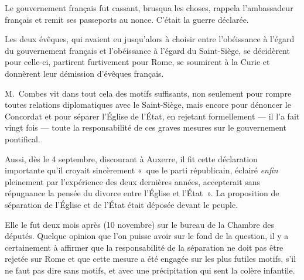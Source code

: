 \documentclass[french,twoside]{book} %
\begin{document}
Le gouvernement français fut cassant, brusqua les choses, rappela l’ambassadeur français et remit ses passeports au nonce. C’était la guerre déclarée.\par
Les deux évêques, qui avaient eu jusqu’alors à choisir entre l’obéissance à l’égard du gouvernement français et l’obéissance à l’égard du Saint-Siège, se décidèrent pour celle-ci, partirent furtivement pour Rome, se soumirent à la Curie et donnèrent leur démission d’évêques français.\par
M. Combes vit dans tout cela des motifs suffisants, non seulement pour rompre toutes relations diplomatiques avec le Saint-Siège, mais encore pour dénoncer le Concordat et pour séparer l’Église de l’État, en rejetant formellement — il l’a fait vingt fois — toute la responsabilité de ces graves mesures sur le gouvernement pontifical.\par
Aussi, dès le 4 septembre, discourant à Auxerre, il fit cette déclaration importante qu’il croyait  sincèrement « que le parti républicain, éclairé {\itshape enfin} pleinement par l’expérience des deux dernières années, accepterait sans répugnance la pensée du divorce entre l’Église et l’État ». La proposition de séparation de l’Église et de l’État était déposée devant le peuple.\par
Elle le fut deux mois après (10 novembre) sur le bureau de la Chambre des députés. Quelque opinion que l’on puisse avoir sur le fond de la question, il y a certainement à affirmer que la responsabilité de la séparation ne doit pas être rejetée sur Rome et que cette mesure a été engagée sur les plus futiles motifs, s’il ne faut pas dire sans motifs, et avec une précipitation qui sent la colère infantile.\par
\end{document}
